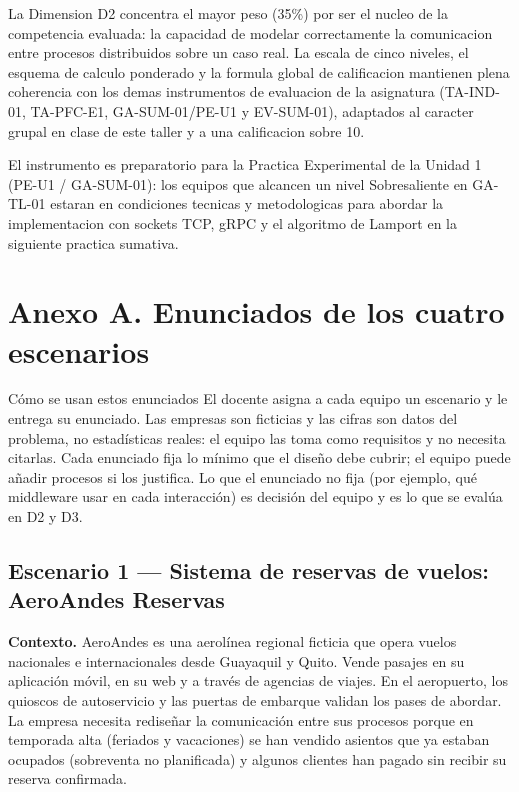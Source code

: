 \documentclass[10pt]{article}
\begin{document}
La Dimension D2 concentra el mayor peso (35\%) por ser el nucleo de la competencia evaluada: la capacidad de modelar correctamente la comunicacion entre procesos distribuidos sobre un caso real. La escala de cinco niveles, el esquema de calculo ponderado y la formula global de calificacion mantienen plena coherencia con los demas instrumentos de evaluacion de la asignatura (TA-IND-01, TA-PFC-E1, GA-SUM-01/PE-U1 y EV-SUM-01), adaptados al caracter grupal en clase de este taller y a una calificacion sobre 10.

El instrumento es preparatorio para la Practica Experimental de la Unidad 1 (PE-U1 / GA-SUM-01): los equipos que alcancen un nivel Sobresaliente en GA-TL-01 estaran en condiciones tecnicas y metodologicas para abordar la implementacion con sockets TCP, gRPC y el algoritmo de Lamport en la siguiente practica sumativa.


\newpage

\section{Anexo A. Enunciados de los cuatro escenarios}

\begin{infobox}{Cómo se usan estos enunciados}
	El docente asigna a cada equipo un escenario y le entrega su enunciado. Las empresas son ficticias y las cifras son datos del problema, no estadísticas reales: el equipo las toma como requisitos y no necesita citarlas. Cada enunciado fija lo mínimo que el diseño debe cubrir; el equipo puede añadir procesos si los justifica. Lo que el enunciado no fija (por ejemplo, qué middleware usar en cada interacción) es decisión del equipo y es lo que se evalúa en D2 y D3.
\end{infobox}

\subsection{Escenario 1 --- Sistema de reservas de vuelos: AeroAndes Reservas}

\textbf{Contexto.} AeroAndes es una aerolínea regional ficticia que opera vuelos nacionales e internacionales desde Guayaquil y Quito. Vende pasajes en su aplicación móvil, en su web y a través de agencias de viajes. En el aeropuerto, los quioscos de autoservicio y las puertas de embarque validan los pases de abordar. La empresa necesita rediseñar la comunicación entre sus procesos porque en temporada alta (feriados y vacaciones) se han vendido asientos que ya estaban ocupados (sobreventa no planificada) y algunos clientes han pagado sin recibir su reserva confirmada.
\end{document}
